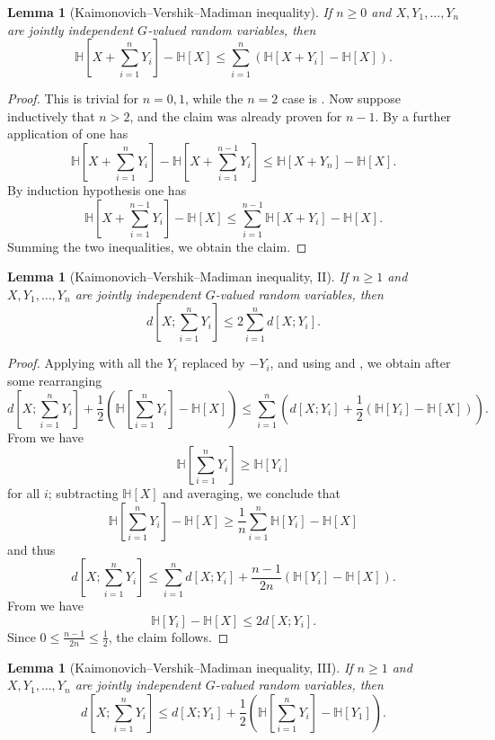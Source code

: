 \documentclass[10pt,a4paper]{article}
\newtheorem{lemma}[theorem]{Lemma}
\newcommand{\lean}[1]{}
\newcommand{\uses}[1]{}
\newcommand{\leanok}{}
\newcommand{\bbH}{\mathbb{H}}
\begin{document}
\begin{lemma}[Kaimonovich--Vershik--Madiman inequality]\label{klm-1}\lean{kvm_ineq_I}\leanok  If $n \geq 0$ and $X, Y_1, \dots, Y_n$ are jointly independent $G$-valued random variables, then
  $$\bbH\left[X + \sum_{i=1}^n Y_i\right] - \bbH[X] \leq \sum_{i=1}^n \left(\bbH[X+Y_i] - \bbH[X]\right).$$
\end{lemma}

\begin{proof}\uses{kv}\leanok  This is trivial for $n=0,1$, while the $n=2$ case is .  Now suppose inductively that $n > 2$, and the claim was already proven for $n-1$.  By a further application of  one has
$$  \bbH\left[X + \sum_{i=1}^n Y_i\right] -  \bbH\left[X + \sum_{i=1}^{n-1} Y_i\right] \leq \bbH[X+Y_n] - \bbH[X].$$
By induction hypothesis one has
$$ \bbH\left[X + \sum_{i=1}^{n-1} Y_i\right] - \bbH[X] \leq \sum_{i=1}^{n-1} \bbH[X+Y_i] - \bbH[X].$$
Summing the two inequalities, we obtain the claim.
\end{proof}

\begin{lemma}[Kaimonovich--Vershik--Madiman inequality, II]\label{klm-2}\lean{kvm_ineq_II}\leanok  If $n \geq 1$ and $X, Y_1, \dots, Y_n$ are jointly independent $G$-valued random variables, then
  $$ d[X; \sum_{i=1}^n Y_i] \leq 2 \sum_{i=1}^n d[X; Y_i].$$
\end{lemma}

\begin{proof}\uses{klm-1, neg-ent, ruz-indep, sumset-lower, ruzsa-diff}\leanok
  Applying  with all the $Y_i$ replaced by $-Y_i$, and using  and , we obtain after some rearranging
$$ d[X; \sum_{i=1}^n Y_i] + \frac{1}{2} (\bbH[\sum_{i=1}^n Y_i] - \bbH[X]) \leq \sum_{i=1}^n \left(d[X;Y_i] + \frac{1}{2} (\bbH[Y_i] - \bbH[X])\right).$$
From  we have
$$ \bbH[\sum_{i=1}^n Y_i] \geq \bbH[Y_i]$$
for all $i$; subtracting $\bbH[X]$ and averaging, we conclude that
$$ \bbH[\sum_{i=1}^n Y_i] - \bbH[X] \geq \frac{1}{n} \sum_{i=1}^n \bbH[Y_i] - \bbH[X]$$
and thus
$$ d[X; \sum_{i=1}^n Y_i] \leq \sum_{i=1}^n d[X;Y_i] + \frac{n-1}{2n} (\bbH[Y_i] - \bbH[X]).$$
From  we have
$$ \bbH[Y_i] - \bbH[X] \leq 2 d[X;Y_i].$$
Since $0 \leq \frac{n-1}{2n} \leq \frac{1}{2}$, the claim follows.
\end{proof}

\begin{lemma}[Kaimonovich--Vershik--Madiman inequality, III]\label{klm-3}\lean{kvm_ineq_III}\leanok  If $n \geq 1$ and $X, Y_1, \dots, Y_n$ are jointly independent $G$-valued random variables, then
  $$d\left[X; \sum_{i=1}^n Y_i\right] \leq d\left[X; Y_1\right] + \frac{1}{2}\left(\bbH\left[ \sum_{i=1}^n Y_i\right] - \bbH[Y_1]\right).$$
\end{lemma}
\end{document}
